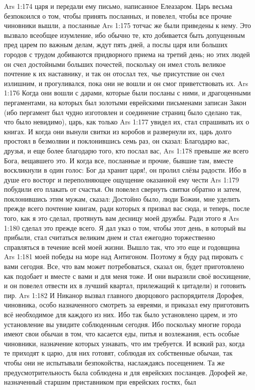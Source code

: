 \vs Ars 1:174
царя и передали ему письмо, написанное Елеазаром. Царь весьма безпокоился о том, чтобы принять посланных, и повелел, чтобы все прочие чиновники вышли, а посланные
\vs Ars 1:175
тотчас же были приведены к нему. Это вызвало всеобщее изумление, ибо обычно те, кто добивается быть допущенным пред царем по важным делам, ждут пять дней, а послы царя или больших городов с трудом добиваются придворного приема на третий день; но этих людей он счел достойными больших почестей, поскольку он имел столь великое почтение к их наставнику, и так он отослал тех, чье присутствие он счел излишним, и прогуливался, пока они не вошли и он смог приветствовать их.
\vs Ars 1:176
Когда они вошли с дарами, которые были посланы с ними, и драгоценными пергаментами, на которых был золотыми еврейскими письменами записан Закон (ибо пергамент был чудно изготовлен и соединение страниц было сделано так, что было невидимо), царь, как только
\vs Ars 1:177
увидел их, стал спрашивать их о книгах. И когда они вынули свитки из коробов и развернули их, царь долго простоял в безмолвии и поклонившись семь раз, он сказал: Благодарю вас, друзья, и еще более благодарю того, кто послал вас,
\vs Ars 1:178
превыше же всего Бога, вещавшего это. И когда все, посланные и прочие, бывшие там, вместе воскликнули в один голос: Бог да хранит царя!, он пролил слёзы радости. Ибо в душе его восторг и переполняющее ощущение оказанной ему чести
\vs Ars 1:179
побудили его плакать от счастья. Он повелел свернуть свитки обратно и затем, поклонившись этим мужам, сказал: Достойно было, люди Божии, мне уделить прежде всего почтение книгам, ради которых я призвал вас сюда, и теперь, после того, как я это сделал, протянуть вам десницу моей дружбы. Ради этого я
\vs Ars 1:180
сделал это прежде всего. Я дал указ о том, чтобы этот день, в который вы прибыли, стал считаться великим днем и стал ежегодно торжественно справляться в течение всей моей жизни. Вышло так, что это еще и годовщина
\vs Ars 1:181
моей победы на море над Антигоном. Поэтому я буду рад пировать с вами сегодня. Все, что вам может потребоваться, сказал он, будет приготовлено как подобает и вместе с вами и для меня тоже. И они выразили своё восхищение, и он повелел отвести их в лучший квартал, прилежащий к цитадели) и готовить пир.
\vs Ars 1:182
И Никанор вызвал главного дворцового распорядителя Дорофея, чиновника, особо назначенного смотреть за евреями, и приказал ему приготовить всё необходимое для каждого из них. Ибо так было установлено царем, и это установление вы увидите соблюденным сегодня. Ибо поскольку многие города имеют свои обычаи в том, что касается еды, питья и возлежания, есть особые чиновники, назначение которых узнавать, что им требуется. И всякий раз, когда те приходят к царю, для них готовят, соблюдая их собственные обычаи, так чтобы они не испытывали безпокойства, наслаждаясь посещением. Та же предусмотрительность была соблюдена и для еврейских посланцев. Дорофей же, назначенный старшим приставником при еврейских гостях, был
